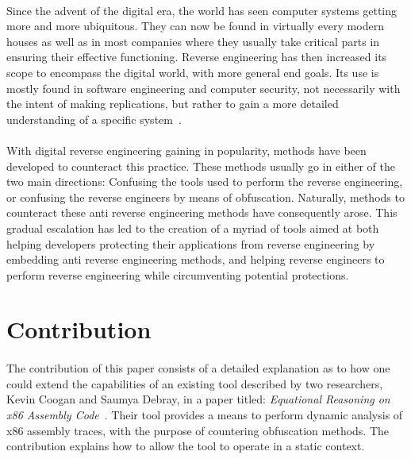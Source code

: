 \paragraph{}
Since the advent of the digital era, the world has seen computer systems getting more and more ubiquitous. They can now be found in virtually every modern houses as well as in most companies where they usually take critical parts in ensuring their effective functioning. Reverse engineering has then increased its scope to encompass the digital world, with more general end goals. Its use is mostly found in software engineering and computer security, not necessarily with the intent of making replications, but rather to gain a more detailed understanding of a specific system~\cite{chikofsky1990reverse}.

\paragraph{}
With digital reverse engineering gaining in popularity, methods have been developed to counteract this practice. These methods usually go in either of the two main directions: Confusing the tools used to perform the reverse engineering, or confusing the reverse engineers by means of obfuscation. Naturally, methods to counteract these anti reverse engineering methods have consequently arose. This gradual escalation has led to the creation of a myriad of tools aimed at both helping developers protecting their applications from reverse engineering by embedding anti reverse engineering methods, and helping reverse engineers to perform reverse engineering while circumventing potential protections.

\section{Contribution}
\paragraph{}
The contribution of this paper consists of a detailed explanation as to how one could extend the capabilities of an existing tool described by two researchers, Kevin Coogan and Saumya Debray, in a paper titled: \textit{Equational Reasoning on x86 Assembly Code}~\cite{coogan2011equational}. Their tool provides a means to perform dynamic analysis of x86 assembly traces, with the purpose of countering obfuscation methods. The contribution explains how to allow the tool to operate in a static context.

